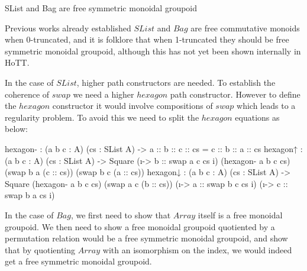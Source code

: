 \documentclass{article}
\newenvironment{code}{\verbatim}{\endverbatim}
\begin{document}
\begin{myconj}
    SList and Bag are free symmetric monoidal groupoid
\end{myconj}
Previous works already established $SList$ and $Bag$ are free commutative
monoids when 0-truncated, and it is folklore that when 1-truncated they should be free symmetric monoidal groupoid, although
this has not yet been shown internally in HoTT. 

In the case of $SList$, higher path constructors are needed. To establish the coherence of $swap$ we need a higher $hexagon$
path constructor. However to define the $hexagon$ constructor it would involve compositions of $swap$ which leads to a regularity
problem. To avoid this we need to split the $hexagon$ equations as below:

\begin{code}
  hexagon- : (a b c : A) (cs : SList A)
           -> a :: b :: c :: cs = c :: b :: a :: cs
  hexagon↑ : (a b c : A) (cs : SList A)
           -> Square (\i -> b :: swap a c cs i) (hexagon- a b c cs)
                     (swap b a (c :: cs)) (swap b c (a :: cs))
  hexagon↓ : (a b c : A) (cs : SList A)
           -> Square (hexagon- a b c cs) (swap a c (b :: cs))
                     (\i -> a :: swap b c cs i) (\i -> c :: swap b a cs i)
\end{code}


In the case of $Bag$, we first need to show that $Array$ itself is a free monoidal groupoid. We then need to show a free
monoidal groupoid quotiented by a permutation relation would be a free symmetric monoidal groupoid, and show that by quotienting
$Array$ with an isomorphism on the index, we would indeed get a free symmetric monoidal groupoid.

\printbibliography
\end{document}
